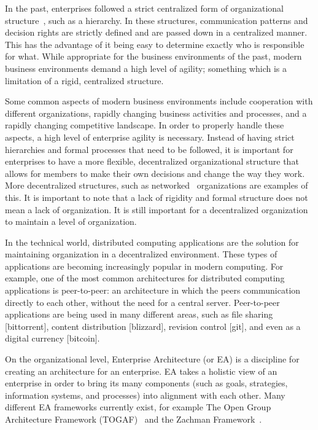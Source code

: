 In the past, enterprises followed a strict centralized form of organizational structure~\cite{pearlson2009}, such as a hierarchy. In these structures, communication patterns and decision rights are strictly defined and are passed down in a centralized manner.  This has the advantage of it being easy to determine exactly who is responsible for what. While appropriate for the business environments of the past, modern business  environments demand a high level of agility; something which is a limitation of a rigid, centralized structure.

Some common aspects of modern business environments include cooperation with different organizations,  rapidly changing business activities and processes, and a rapidly changing competitive landscape. In order to properly handle these aspects, a high level of enterprise agility is necessary. Instead of having strict hierarchies and formal processes that need to be followed, it is important for enterprises to have a more flexible, decentralized organizational structure that allows for members to make their own decisions and change the way they work. More decentralized structures, such as networked~\cite{pearlson2009} organizations are examples of this. It is important to note that a lack of rigidity and formal structure does not mean a lack of organization. It is still important for a decentralized organization to maintain a level of organization.

In the technical world, distributed computing applications are the solution for maintaining organization in a decentralized environment. These types of applications are becoming increasingly popular in modern computing. For example, one of the most common architectures for distributed computing applications is peer-to-peer: an architecture in which the peers communication directly to each other, without the need for a central server. Peer-to-peer applications are being used in many different areas, such as file sharing [bittorrent], content distribution [blizzard], revision control [git], and even as a digital currency [bitcoin].

On the organizational level, Enterprise Architecture (or EA) is a discipline for creating an architecture for an enterprise. EA takes a holistic view of an enterprise in order to bring its many components (such as goals, strategies, information systems, and processes) into alignment with each other. Many different EA frameworks currently exist, for example The Open Group Architecture Framework (TOGAF)~\cite{togaf9.1} and the Zachman Framework~\cite{zachman}. 

